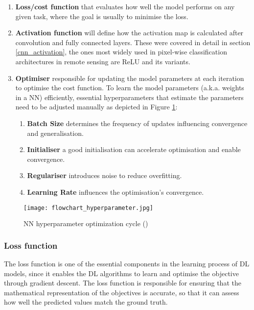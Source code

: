 \begin{enumerate}
    \item \textbf{Loss/cost function} that evaluates how well the model performs on any given task, where the goal is usually to minimise the loss.
    \item \textbf{Activation function} will define how the activation map is calculated after convolution and fully connected layers. These were covered in detail in section \ref{cnn_activation}, the ones most widely used in pixel-wise classification architectures in remote sensing are \gls{ReLU} and its variants.
    \item \textbf{Optimiser} responsible for updating the model parameters at each iteration to optimise the cost function. To learn the model parameters (\gls{a.k.a.} weights in a \gls{NN}) efficiently, essential hyperparameters that estimate the parameters need to be adjusted manually as depicted in Figure \ref{fig_hyperparameter}:
        \begin{enumerate}
            \item \textbf{Batch Size} determines the frequency of updates influencing convergence and generalisation.
            \item \textbf{Initialiser} a good initialisation can accelerate optimisation and enable convergence.
            \item \textbf{Regulariser} introduces noise to reduce overfitting.
            \item \textbf{Learning Rate} influences the optimisation’s convergence.
        \end{enumerate}
        
\end{enumerate}

    \begin{figure}[hbt!]
        \centering
        \texttt{[image: flowchart\_hyperparameter.jpg]}
        \caption{NN hyperparameter optimization cycle (\cite{hyperparameter_fig})}
        \label{fig_hyperparameter}
    \end{figure}
\subsubsection{Loss function} \label{loss_functions}
The loss function is one of the essential components in the learning process of \gls{DL} models, since it enables the \gls{DL} algorithms to learn and optimise the objective through gradient descent. The loss function is responsible for ensuring that the mathematical representation of the objectives is accurate, so that it can assess how well the predicted values match the ground truth.

